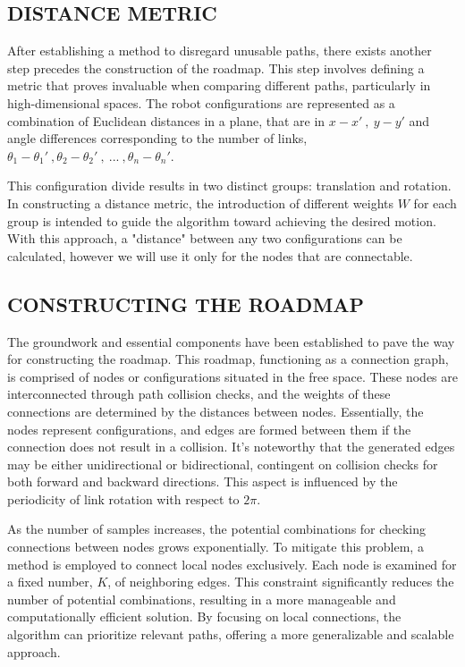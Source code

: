 \documentclass{IEEEtaes}
\begin{document}
\subsection{\fontsize{10}{13}\selectfont DISTANCE METRIC}
After establishing a method to disregard unusable paths, there exists another step precedes the construction of the roadmap. This step involves defining a metric that proves invaluable when comparing different paths, particularly in high-dimensional spaces. The robot configurations are represented as a combination of Euclidean distances in a plane, that are in $x-x'\ ,\ y-y'$ and angle differences corresponding to the number of links, $\theta_1-\theta_1' \ , \theta_2 - \theta_2' \ , \ ... \ , \theta_n - \theta_n'$. 

This configuration divide results in two distinct groups: translation and rotation. In constructing a distance metric, the introduction of different weights $W$ for each group is intended to guide the algorithm toward achieving the desired motion. With this approach, a "distance" between any two configurations can be calculated, however we will use it only for the nodes that are connectable.


\subsection{\fontsize{10}{13}\selectfont CONSTRUCTING THE ROADMAP}
The groundwork and essential components have been established to pave the way for constructing the roadmap. This roadmap, functioning as a connection graph, is comprised of nodes or configurations situated in the free space. These nodes are interconnected through path collision checks, and the weights of these connections are determined by the distances between nodes. Essentially, the nodes represent configurations, and edges are formed between them if the connection does not result in a collision. It's noteworthy that the generated edges may be either unidirectional or bidirectional, contingent on collision checks for both forward and backward directions. This aspect is influenced by the periodicity of link rotation with respect to $2\pi$.

As the number of samples increases, the potential combinations for checking connections between nodes grows exponentially. To mitigate this problem, a method is employed to connect local nodes exclusively. Each node is examined for a fixed number, $K$, of neighboring edges. This constraint significantly reduces the number of potential combinations, resulting in a more manageable and computationally efficient solution. By focusing on local connections, the algorithm can prioritize relevant paths, offering a more generalizable and scalable approach.
\end{document}
